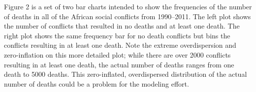 \documentclass[letterpaper,10pt,english]{/usr/share/sphinx/texinputs/sphinxhowto}
\begin{document}
        
    
Figure 2 is a set of two bar charts intended to show the frequencies of
the number of deaths in all of the African social conflicts from
1990--2011. The left plot shows the number of conflicts that resulted in
no deaths and at least one death. The right plot shows the same
frequency bar for no death conflicts but bins the conflicts resulting in
at least one death. Note the extreme overdispersion and zero-inflation
on this more detailed plot; while there are over 2000 conflicts
resulting in at least one death, the actual number of deaths ranges from
one death to 5000 deaths. This zero-inflated, overdispersed distribution
of the actual number of deaths could be a problem for the modeling
effort.

\end{document}
